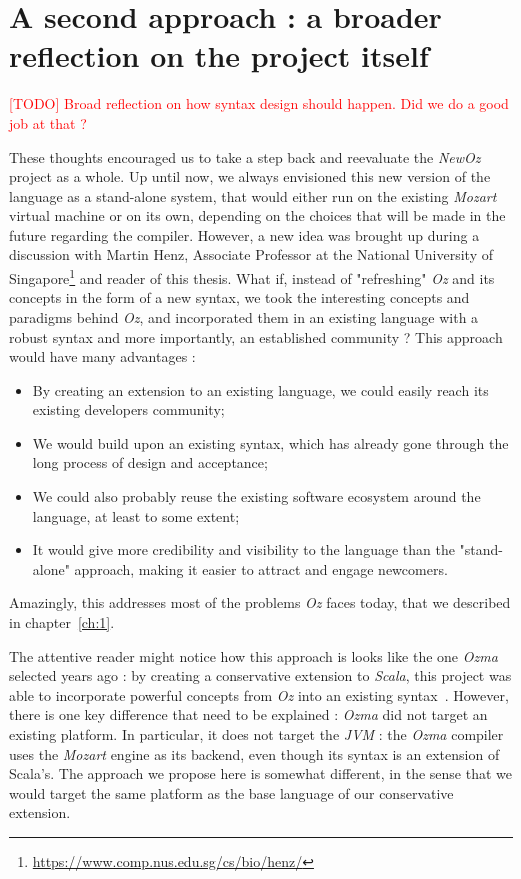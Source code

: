 \section{A second approach : a broader reflection on the project itself}\label{sec:ch4-reflection}
\textcolor{red}{[TODO] Broad reflection on how syntax design should happen. Did we do a good job at that ?}

These thoughts encouraged us to take a step back and reevaluate the \textit{NewOz} project as a whole.
Up until now, we always envisioned this new version of the language as a stand-alone system, that would either run on the existing \textit{Mozart} virtual machine or on its own, depending on the choices that will be made in the future regarding the compiler.
However, a new idea was brought up during a discussion with Martin Henz, Associate Professor at the National University of Singapore\footnote{\url{https://www.comp.nus.edu.sg/cs/bio/henz/}} and reader of this thesis.
What if, instead of "refreshing" \textit{Oz} and its concepts in the form of a new syntax, we took the interesting concepts and paradigms behind \textit{Oz}, and incorporated them in an existing language with a robust syntax and more importantly, an established community ?
This approach would have many advantages :
\begin{itemize}
    \item By creating an extension to an existing language, we could easily reach its existing developers community;
    \item We would build upon an existing syntax, which has already gone through the long process of design and acceptance;
    \item We could also probably reuse the existing software ecosystem around the language, at least to some extent;
    \item It would give more credibility and visibility to the language than the "stand-alone" approach, making it easier to attract and engage newcomers.
\end{itemize}
Amazingly, this addresses most of the problems \textit{Oz} faces today, that we described in chapter~\ref{ch:1}.\newline

The attentive reader might notice how this approach is looks like the one \textit{Ozma} selected years ago : by creating a conservative extension to \textit{Scala}, this project was able to incorporate powerful concepts from \textit{Oz} into an existing syntax~\cite{Ozma}.
However, there is one key difference that need to be explained : \textit{Ozma} did not target an existing platform.
In particular, it does not target the \textit{JVM} : the \textit{Ozma} compiler uses the \textit{Mozart} engine as its backend, even though its syntax is an extension of Scala's.
The approach we propose here is somewhat different, in the sense that we would target the same platform as the base language of our conservative extension.\newline

